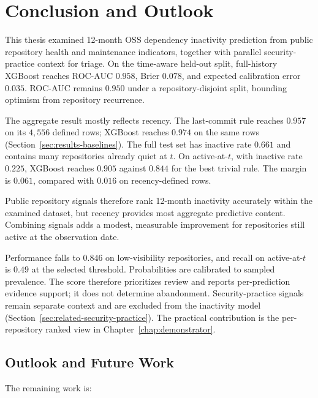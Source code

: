 \chapter{Conclusion and Outlook}
\label{chap:conclusion}

This thesis examined 12-month OSS dependency inactivity prediction from public
repository health and maintenance indicators, together with parallel
security-practice context for triage. On the time-aware held-out split,
full-history XGBoost reaches ROC-AUC \(0.958\), Brier \(0.078\), and expected
calibration error \(0.035\). ROC-AUC remains \(0.950\) under a
repository-disjoint split, bounding optimism from repository recurrence.

The aggregate result mostly reflects recency. The last-commit rule reaches
\(0.957\) on its \(4{,}556\) defined rows; XGBoost reaches \(0.974\) on the same
rows (Section~\ref{sec:results-baselines}). The full test set has inactive rate
\(0.661\) and contains many repositories already quiet at \(t\). On
active-at-\(t\), with inactive rate \(0.225\), XGBoost reaches \(0.905\) against
\(0.844\) for the best trivial rule. The margin is \(0.061\), compared with
\(0.016\) on recency-defined rows.

Public repository signals therefore rank 12-month inactivity accurately within
the examined dataset, but recency provides most aggregate predictive content.
Combining signals adds a modest, measurable improvement for repositories still
active at the observation date.

Performance falls to \(0.846\) on low-visibility repositories, and recall on
active-at-\(t\) is \(0.49\) at the selected threshold. Probabilities are
calibrated to sampled prevalence. The score therefore prioritizes review and
reports per-prediction evidence support; it does not determine abandonment.
Security-practice signals remain separate context and are excluded from the
inactivity model (Section~\ref{sec:related-security-practice}). The practical
contribution is the per-repository ranked view in
Chapter~\ref{chap:demonstrator}.

\section{Outlook and Future Work}
\label{sec:conclusion-outlook}

The remaining work is:

